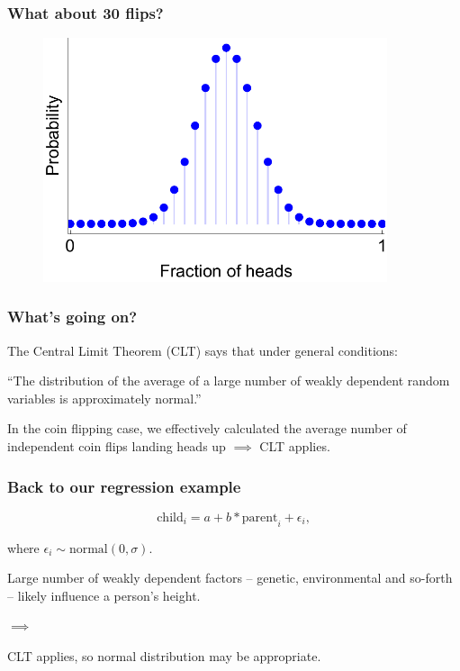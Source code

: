 \documentclass[handout]{beamer}
\begin{document}
\begin{frame}
	\frametitle{What about 30 flips?}
	
	\begin{figure}[ht]
		\centerline{\includegraphics[width=0.9\textwidth]{../figures/binomial_30.pdf}}
	\end{figure}
	
\end{frame}

\begin{frame}
	\frametitle{What's going on?}
	The Central Limit Theorem (CLT) says that under general conditions:
	
	\vspace{0.5cm}
	
	``The distribution of the average of a large number of weakly dependent random variables is approximately normal.''
	
	\vspace{0.5cm}
	
	In the coin flipping case, we effectively calculated the average number of independent coin flips landing heads up $\implies$ CLT applies.
	
\end{frame}

\begin{frame}
	\frametitle{Back to our regression example}

	\begin{equation}
	\text{child}_i = a + b * \text{parent}_i + \epsilon_i,
	\end{equation}
	
	where $\epsilon_i \sim \text{normal}(0, \sigma)$.
	
	\vspace{0.5cm}
	
	Large number of weakly dependent factors -- genetic, environmental and so-forth -- likely influence a person's height.
	
	$\implies$
	
	CLT applies, so normal distribution may be appropriate.
	
\end{frame}
\end{document}
